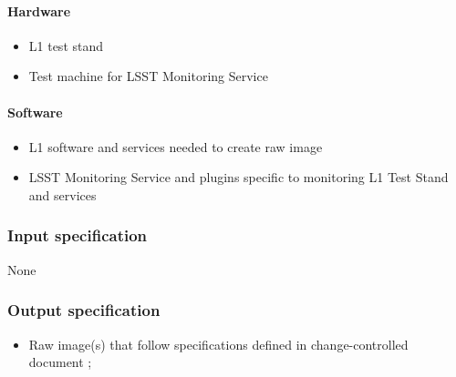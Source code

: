 \documentclass[DM,lsstdraft,STS,toc]{lsstdoc}
\begin{document}
\paragraph{Hardware}
\begin{itemize}
\item{L1 test stand}
\item{Test machine for LSST Monitoring Service}
\end{itemize}


\paragraph{Software}
\begin{itemize}
\item{L1 software and services needed to create raw image}
\item{LSST Monitoring Service and plugins specific to monitoring L1 Test Stand and services}
\end{itemize}


\subsubsection{Input specification}
None
\subsubsection{Output specification}
\begin{itemize}
\item{Raw image(s) that follow specifications defined in change-controlled document ;}
\end{itemize}
\end{document}
